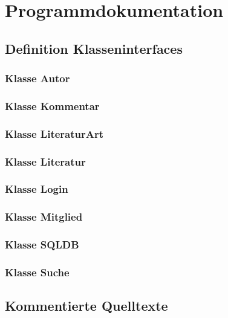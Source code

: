 \chapter{Programmdokumentation}
\section{Definition Klasseninterfaces}
\subsection{Klasse Autor}


\subsection{Klasse Kommentar}


\subsection{Klasse LiteraturArt}


\subsection{Klasse Literatur}


\subsection{Klasse Login}


\subsection{Klasse Mitglied}


\subsection{Klasse SQLDB}


\subsection{Klasse Suche}


\section{Kommentierte Quelltexte}
